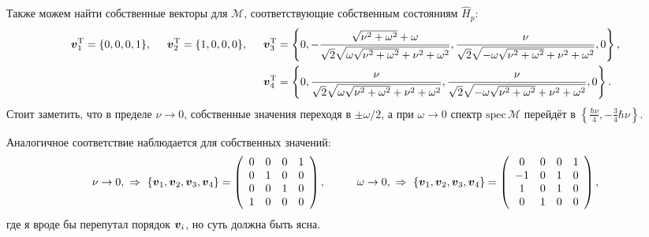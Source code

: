 Также можем найти собственные векторы для $\mathcal M$, соответствующие собственным состояниям $\hat{H}_p$:
\begin{align*}
    \mbox{\boldmath $v$}_1^{\text{T}} = \{0,0,0,1\}, \hspace{5 mm} 
    \mbox{\boldmath $v$}_2^{\text{T}} = \{1,0,0,0\}, \hspace{5 mm} 
    \mbox{\boldmath $v$}_3^{\text{T}} &= \left\{0,-\frac{\sqrt{\nu ^2+\omega ^2}+\omega }{\sqrt{2} \sqrt{\omega  \sqrt{\nu ^2+\omega ^2}+\nu ^2+\omega ^2}},\frac{\nu }{\sqrt{2} \sqrt{-\omega  \sqrt{\nu ^2+\omega ^2}+\nu ^2+\omega ^2}},0\right\},
    \\
    \mbox{\boldmath $v$}_4^{\text{T}} &= \left\{0,\frac{\nu }{\sqrt{2} \sqrt{\omega  \sqrt{\nu ^2+\omega ^2}+\nu ^2+\omega ^2}},\frac{\nu }{\sqrt{2} \sqrt{-\omega  \sqrt{\nu ^2+\omega ^2}+\nu ^2+\omega ^2}},0\right\}.
\end{align*}
Стоит заметить, что в пределе $\nu \to 0$, собственные значения переходя в $\pm \omega/2$, а при $\omega \to 0$ спектр $\text{spec}\, \mathcal M$ перейдёт в $\left\{\frac{\hbar\nu}{4},-\frac{3}{4}\hbar\nu\right\}$.

Аналогичное соответствие наблюдается для собственных значений:
\begin{equation*}
    \nu \to 0, \ \Rightarrow \ 
    \{\vc{v}_1, \vc{v}_2, \vc{v}_3, \vc{v}_4\} = \left(
\begin{array}{cccc}
 0 & 0 & 0 & 1 \\
 0 & 1 & 0 & 0 \\
 0 & 0 & 1 & 0 \\
 1 & 0 & 0 & 0 \\
\end{array}
\right),
\hspace{10 mm} 
    \omega \to 0, \ \Rightarrow \ 
    \{\vc{v}_1, \vc{v}_2, \vc{v}_3, \vc{v}_4\} = 
    \left(
\begin{array}{cccc}
 0 & 0 & 0 & 1 \\
 -1 & 0 & 1 & 0 \\
 1 & 0 & 1 & 0 \\
 0 & 1 & 0 & 0 \\
\end{array}
\right),
\end{equation*}
где я вроде бы перепутал порядок $\mbox{\boldmath $v$}_i$, но суть должна быть ясна. 


